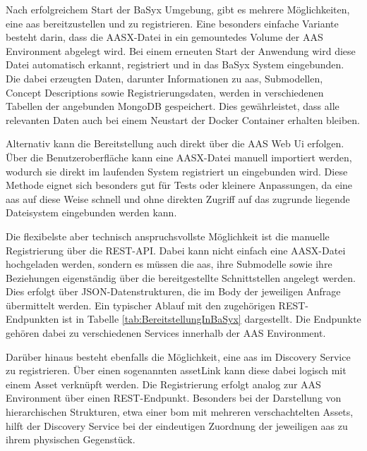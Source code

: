 Nach erfolgreichem Start der BaSyx Umgebung, gibt es mehrere Möglichkeiten, eine \acs{aas} bereitzustellen und zu registrieren.
Eine besonders einfache Variante besteht darin, dass die AASX-Datei in ein gemountedes Volume der AAS Environment abgelegt wird.
Bei einem erneuten Start der Anwendung wird diese Datei automatisch erkannt, registriert und in das BaSyx System eingebunden.
Die dabei erzeugten Daten, darunter Informationen zu \acs{aas}, Submodellen, Concept Descriptions sowie Registrierungsdaten, werden in verschiedenen Tabellen der angebunden MongoDB gespeichert.
Dies gewährleistet, dass alle relevanten Daten auch bei einem Neustart der Docker Container erhalten bleiben.

Alternativ kann die Bereitstellung auch direkt über die AAS Web Ui erfolgen.
Über die Benutzeroberfläche kann eine AASX-Datei manuell importiert werden, wodurch sie direkt im laufenden System registriert un eingebunden wird.
Diese Methode eignet sich besonders gut für Tests oder kleinere Anpassungen, da eine \acs{aas} auf diese Weise schnell und ohne direkten Zugriff auf das zugrunde liegende Dateisystem eingebunden werden kann.

Die flexibelste aber technisch anspruchsvollste Möglichkeit ist die manuelle Registrierung über die REST-API. 
Dabei kann nicht einfach eine AASX-Datei hochgeladen werden, sondern es müssen die \acs{aas}, ihre Submodelle sowie ihre Beziehungen eigenständig über die bereitgestellte Schnittstellen angelegt werden.
Dies erfolgt über JSON-Datenstrukturen, die im Body der jeweiligen Anfrage übermittelt werden.
Ein typischer Ablauf mit den zugehörigen REST-Endpunkten ist in Tabelle \ref{tab:BereitstellungInBaSyx} dargestellt.
Die Endpunkte gehören dabei zu verschiedenen Services innerhalb der AAS Environment.



Darüber hinaus besteht ebenfalls die Möglichkeit, eine \acs{aas} im Discovery Service zu registrieren.
Über einen sogenannten assetLink kann diese dabei logisch mit einem Asset verknüpft werden.
Die Registrierung erfolgt analog zur AAS Environment über einen REST-Endpunkt.
Besonders bei der Darstellung von hierarchischen Strukturen, etwa einer \acs{bom} mit mehreren verschachtelten Assets, hilft der Discovery Service bei der eindeutigen Zuordnung der jeweiligen \acs{aas} zu ihrem physischen Gegenstück.

